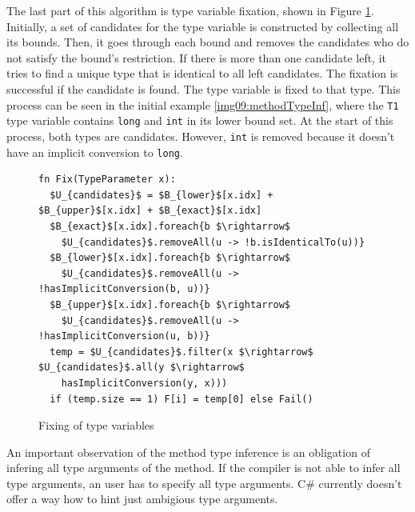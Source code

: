 The last part of this algorithm is type variable fixation, shown in Figure \ref{img13:methodTypeInference4}. 
Initially, a set of candidates for the type variable is constructed by collecting all its bounds.
Then, it goes through each bound and removes the candidates who do not satisfy the bound’s restriction. 
If there is more than one candidate left, it tries to find a unique type that is identical to all left candidates. 
The fixation is successful if the candidate is found. 
The type variable is fixed to that type. 
This process can be seen in the initial example \ref{img09:methodTypeInf}, where the \texttt{T1} type variable contains \texttt{long} and \texttt{int} in its lower bound set. 
At the start of this process, both types are candidates. 
However, \texttt{int} is removed because it doesn’t have an implicit conversion to \texttt{long}.
\par
\begin{figure}[h!]
\begin{lstlisting}[style=myAlgo, mathescape=true]
fn Fix(TypeParameter x):
  $U_{candidates}$ = $B_{lower}$[x.idx] + $B_{upper}$[x.idx] + $B_{exact}$[x.idx]
  $B_{exact}$[x.idx].foreach{b $\rightarrow$ 
    $U_{candidates}$.removeAll(u -> !b.isIdenticalTo(u))}
  $B_{lower}$[x.idx].foreach{b $\rightarrow$ 
    $U_{candidates}$.removeAll(u -> !hasImplicitConversion(b, u))}
  $B_{upper}$[x.idx].foreach{b $\rightarrow$ 
    $U_{candidates}$.removeAll(u -> !hasImplicitConversion(u, b))}
  temp = $U_{candidates}$.filter(x $\rightarrow$ $U_{candidates}$.all(y $\rightarrow$ 
    hasImplicitConversion(y, x)))
  if (temp.size == 1) F[i] = temp[0] else Fail()
\end{lstlisting}
\caption{Fixing of type variables}
\label{img13:methodTypeInference4}
\end{figure}
\par
An important observation of the method type inference is an obligation of infering all type arguments of the method.
If the compiler is not able to infer all type arguments, an user has to specify all type arguments.
C\# currently doesn't offer a way how to hint just ambigious type arguments.


